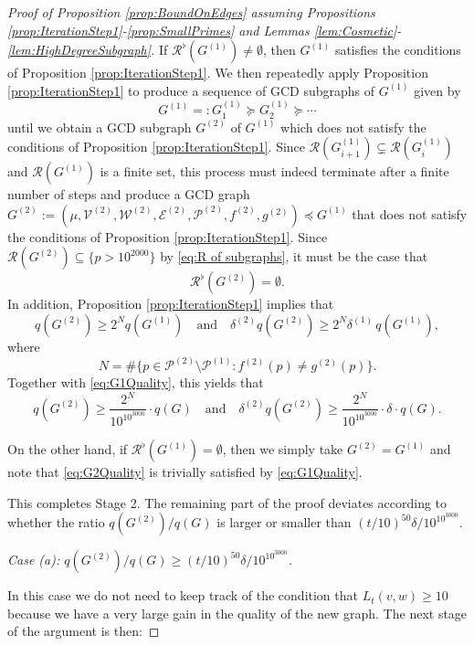 \documentclass[12pt]{amsart}
\numberwithin{equation}{section}
\theoremstyle{definition}
\theoremstyle{remark}
\newcommand{\CE}{\mathcal{E}}
\newcommand{\CP}{\mathcal{P}}
\newcommand{\CR}{\mathcal{R}}
\newcommand{\CV}{\mathcal{V}}
\newcommand{\CW}{\mathcal{W}}
\renewcommand{\ge}{\geqslant}
\begin{document}
\begin{proof}[Proof of Proposition \ref{prop:BoundOnEdges} assuming Propositions \ref{prop:IterationStep1}-\ref{prop:SmallPrimes} and Lemmas \ref{lem:Cosmetic}-\ref{lem:HighDegreeSubgraph}]
If $\CR^\flat(G^{(1)})\ne \emptyset$, then $G^{(1)}$ satisfies the conditions of Proposition \ref{prop:IterationStep1}. We then repeatedly apply Proposition \ref{prop:IterationStep1} to produce a sequence of GCD subgraphs of $G^{(1)}$ given by 
\[
G^{(1)}=:G^{(1)}_1\succeq G^{(1)}_2\succeq\cdots
\] 
until we obtain a GCD subgraph $G^{(2)}$ of $G^{(1)}$ which does not satisfy the conditions of Proposition \ref{prop:IterationStep1}. Since $\CR(G^{(1)}_{i+1})\subsetneq \CR(G^{(1)}_i)$ and $\CR(G^{(1)})$ is a finite set, this process must indeed terminate after a finite number of steps and produce a GCD graph $G^{(2)}:=(\mu,\CV^{(2)},\CW^{(2)},\CE^{(2)},\CP^{(2)},f^{(2)},g^{(2)})\preceq G^{(1)}$ that does not satisfy the conditions of Proposition \ref{prop:IterationStep1}. Since $\CR(G^{(2)})\subseteq \{p>10^{2000}\}$ by \eqref{eq:R of subgraphs}, it must be the case that
\[
\CR^\flat(G^{(2)})=\emptyset.
\]
In addition, Proposition \ref{prop:IterationStep1} implies that
\[
q(G^{(2)})\ge 2^N q(G^{(1)})
\quad\text{and}\quad  \delta^{(2)}q(G^{(2)})\ge 2^N\delta^{(1)}\, q(G^{(1)}),
\]
where 
\[
N=\#\{p\in\CP^{(2)}\setminus\CP^{(1)}:f^{(2)}(p)\neq g^{(2)}(p)\}.
\] 
Together with \eqref{eq:G1Quality}, this yields that
\begin{equation}
q(G^{(2)})\ge \frac{2^N}{10^{10^{3000}}} \cdot q(G)
\quad\text{and}\quad  
\delta^{(2)}q(G^{(2)})\ge 
	\frac{2^N}{10^{10^{3000}}} \cdot\delta\cdot q(G).
\label{eq:G2Quality} 
\end{equation}


On the other hand, if $\CR^\flat(G^{(1)})=\emptyset$, then we simply take $G^{(2)}=G^{(1)}$ and note that \eqref{eq:G2Quality} is trivially satisfied by \eqref{eq:G1Quality}.



\medskip

This completes Stage 2. The remaining part of the proof deviates according to whether the ratio $q(G^{(2)})/q(G)$ is larger or smaller than $(t/10)^{50}\delta/10^{10^{3000}}$.


\bigskip



\noindent 
{\it Case (a): $q(G^{(2)})/q(G)\ge (t/10)^{50}\delta/10^{10^{3000}}$.} 

\smallskip

In this case we do not need to keep track of the condition that $L_t(v,w)\ge10$ because we have a very large gain in the quality of the new graph. The next stage of the argument is then:

\bigskip



\end{proof}
\end{document}
